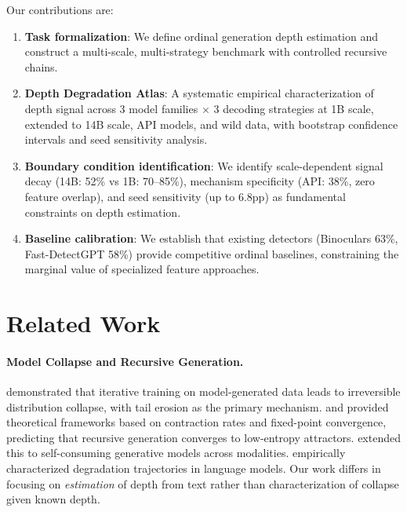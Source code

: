 \documentclass[11pt,a4paper]{article}
\begin{document}
Our contributions are:
\begin{enumerate}[leftmargin=*,nosep]
    \item \textbf{Task formalization}: We define ordinal generation depth estimation and construct a multi-scale, multi-strategy benchmark with controlled recursive chains.
    \item \textbf{Depth Degradation Atlas}: A systematic empirical characterization of depth signal across 3 model families $\times$ 3 decoding strategies at 1B scale, extended to 14B scale, API models, and wild data, with bootstrap confidence intervals and seed sensitivity analysis.
    \item \textbf{Boundary condition identification}: We identify scale-dependent signal decay (14B: 52\% vs 1B: 70--85\%), mechanism specificity (API: 38\%, zero feature overlap), and seed sensitivity (up to 6.8pp) as fundamental constraints on depth estimation.
    \item \textbf{Baseline calibration}: We establish that existing detectors (Binoculars 63\%, Fast-DetectGPT 58\%) provide competitive ordinal baselines, constraining the marginal value of specialized feature approaches.
\end{enumerate}

\section{Related Work}

\paragraph{Model Collapse and Recursive Generation.}
\citet{shumailov2024model} demonstrated that iterative training on model-generated data leads to irreversible distribution collapse, with tail erosion as the primary mechanism. \citet{dohmatob2024tale} and \citet{gerstgrasser2024model} provided theoretical frameworks based on contraction rates and fixed-point convergence, predicting that recursive generation converges to low-entropy attractors. \citet{alemohammad2024selfconsuming} extended this to self-consuming generative models across modalities. \citet{drayson2025emnlp} empirically characterized degradation trajectories in language models. Our work differs in focusing on \emph{estimation} of depth from text rather than characterization of collapse given known depth.
\end{document}
